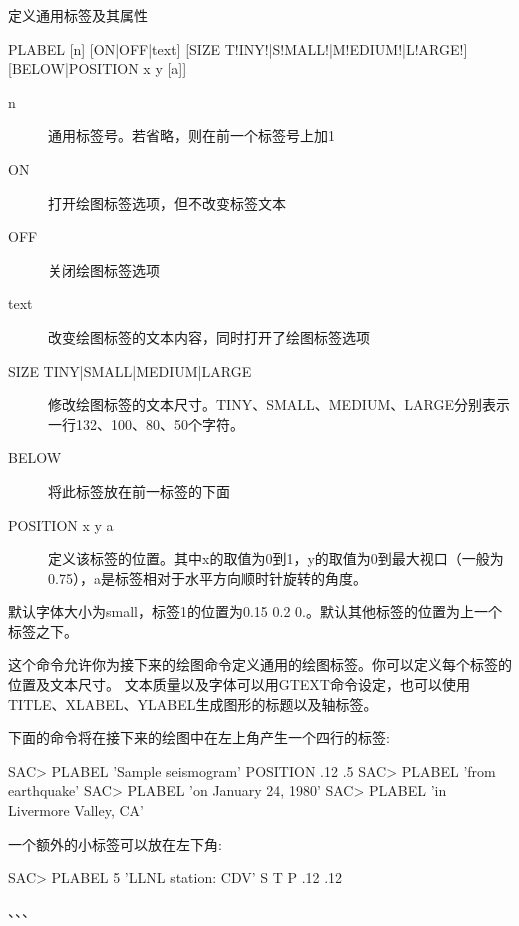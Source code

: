 \label{cmd:plabel}

定义通用标签及其属性

\begin{SACSTX}
PLABEL [n] [ON|OFF|text] [SIZE T!INY!|S!MALL!|M!EDIUM!|L!ARGE!] 
    [BELOW|POSITION x y [a]]
\end{SACSTX}

\begin{description}
\item [n] 通用标签号。若省略，则在前一个标签号上加1
\item [ON] 打开绘图标签选项，但不改变标签文本
\item [OFF] 关闭绘图标签选项 
\item [text] 改变绘图标签的文本内容，同时打开了绘图标签选项 
\item [SIZE TINY|SMALL|MEDIUM|LARGE] 修改绘图标签的文本尺寸。TINY、SMALL、MEDIUM、LARGE分别表示
    一行132、100、80、50个字符。
\item [BELOW] 将此标签放在前一标签的下面
\item [POSITION x y a] 定义该标签的位置。其中x的取值为0到1，y的取值为0到最大视口（一般为0.75），a是标签相对于水平方向顺时针旋转的角度。
\end{description}

默认字体大小为small，标签1的位置为0.15 0.2 0.。默认其他标签的位置为上一个标签之下。

这个命令允许你为接下来的绘图命令定义通用的绘图标签。你可以定义每个标签的位置及文本尺寸。
文本质量以及字体可以用GTEXT命令设定，也可以使用TITLE、XLABEL、YLABEL生成图形的标题以及轴标签。

下面的命令将在接下来的绘图中在左上角产生一个四行的标签:
\begin{SACCode}
SAC> PLABEL 'Sample seismogram' POSITION .12 .5
SAC> PLABEL 'from earthquake'
SAC> PLABEL 'on January 24, 1980'
SAC> PLABEL 'in Livermore Valley, CA'
\end{SACCode}

一个额外的小标签可以放在左下角:
\begin{SACCode}
SAC> PLABEL 5 'LLNL station: CDV' S T P .12 .12
\end{SACCode}

、、、
